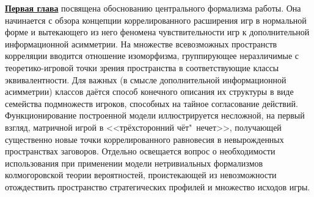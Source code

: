 \underline{\textbf{Первая глава}} посвящена обоснованию центрального формализма работы. Она начинается с обзора концепции коррелированного расширения игр в нормальной форме и вытекающего из него феномена чувствительности игр к дополнительной информационной асимметрии. На множестве всевозможных пространств корреляции вводится отношение изоморфизма, группирующее неразличимые с теоретико-игровой точки зрения пространства в соответствующие классы эквивалентности. Для важных (в смысле дополнительной информационной асимметрии) классов даётся способ конечного описания их структуры в виде семейства подмножеств игроков, способных на тайное согласование действий. Функционирование построенной модели иллюстрируется несложной, на первый взгляд, матричной игрой в <<трёхсторонний чёт"~нечет>>, получающей существенно новые точки коррелированного равновесия в невырожденных пространствах заговоров. Отдельно освещается вопрос о необходимости использования при применении модели нетривиальных формализмов колмогоровской теории вероятностей, проистекающей из невозможности отождествить пространство стратегических профилей и множество исходов игры.

%

